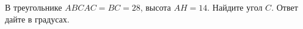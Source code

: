 \begin{ex}
	\begin{condition}
		 В треугольнике \(ABC AC=BC=28\), высота \( AH=14 \). Найдите угол \( C \). Ответ дайте в градусах.
	\end{condition}
\end{ex}